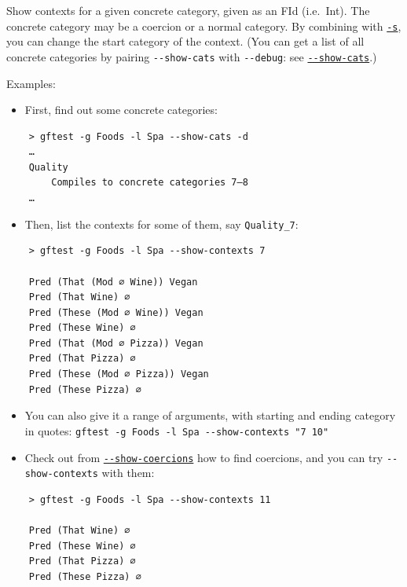 Show contexts for a given concrete category, given as an FId (i.e.~Int).
The concrete category may be a coercion or a normal category. By
combining with
\protect\hyperlink{start-category-for-context--s}{\texttt{-s}}, you can
change the start category of the context.
(You can get a list of all concrete categories by pairing
\texttt{-\/-show-cats} with \texttt{-\/-debug}: see
\protect\hyperlink{--show-cats}{\texttt{-\/-show-cats}}.)

Examples:

\begin{itemize}
\tightlist
\item
  First, find out some concrete categories:
\end{itemize}

\begin{verbatim}
    > gftest -g Foods -l Spa --show-cats -d
    …
    Quality
        Compiles to concrete categories 7—8
    …
\end{verbatim}

\begin{itemize}
\tightlist
\item
  Then, list the contexts for some of them, say \texttt{Quality\_7}:
\end{itemize}

\begin{verbatim}
    > gftest -g Foods -l Spa --show-contexts 7

    Pred (That (Mod ∅ Wine)) Vegan
    Pred (That Wine) ∅
    Pred (These (Mod ∅ Wine)) Vegan
    Pred (These Wine) ∅
    Pred (That (Mod ∅ Pizza)) Vegan
    Pred (That Pizza) ∅
    Pred (These (Mod ∅ Pizza)) Vegan
    Pred (These Pizza) ∅
\end{verbatim}

\begin{itemize}
\item
  You can also give it a range of arguments, with starting and ending
  category in quotes:
  \texttt{gftest\ -g\ Foods\ -l\ Spa\ -\/-show-contexts\ "7\ 10"}
\item
  Check out from
  \protect\hyperlink{--show-coercions}{\texttt{-\/-show-coercions}} how
  to find coercions, and you can try \texttt{-\/-show-contexts} with
  them:
\end{itemize}

\begin{verbatim}
    > gftest -g Foods -l Spa --show-contexts 11

    Pred (That Wine) ∅
    Pred (These Wine) ∅
    Pred (That Pizza) ∅
    Pred (These Pizza) ∅
\end{verbatim}

